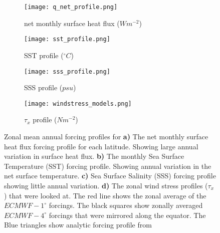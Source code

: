\begin{figure}[H]
\begin{subfigure}{.5\textwidth}
	\caption{net monthly surface heat flux ($Wm^{-2}$)}
	\label{fig:qnet}
	\texttt{[image: q\_net\_profile.png]}
\end{subfigure}
\begin{subfigure}{.5\textwidth}
	\caption{SST profile ($^{\circ}C$)}
	\label{fig:sst_profile}
	\texttt{[image: sst\_profile.png]}
	
\end{subfigure}
\begin{subfigure}{.5\textwidth}
	\caption{SSS profile ($psu$)}
	\label{fig:sss_profile}
	\texttt{[image: sss\_profile.png]}
\end{subfigure}
\begin{subfigure}{.5\textwidth}
	\caption{$\tau_x$ profile ($Nm^{-2}$)}
	\label{fig:tau_profile}
	\texttt{[image: windstress\_models.png]}
\end{subfigure}
\caption{Zonal mean annual forcing profiles for \textbf{a)} The net monthly surface heat flux forcing profile for each latitude. Showing large annual variation in surface heat flux. \textbf{b)} The monthly Sea Surface Temperature (SST) forcing profile. Showing annual variation in the net surface temperature. \textbf{c)} Sea Surface Salinity (SSS) forcing profile showing little annual variation. \textbf{d)} The zonal wind stress profiles ($\tau_x$) that were looked at. The red line shows the zonal average of the $ECMWF-1^{\circ}$ forcings. The black squares show zonally averaged $ECMWF-4^{\circ}$ forcings that were mirrored along the equator. The Blue triangles show analytic forcing profile from \cite{bryan1987parameter}}
\label{fig:idealized_forc}
\end{figure}
\newpage
